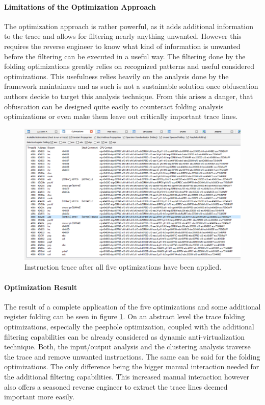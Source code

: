 \documentclass[10pt,twoside,a4paper,bibliography=totoc]{scrbook}
\begin{document}
\paragraph*{Limitations of the Optimization Approach} The optimization approach is rather powerful, as it adds additional information to the trace and allows for filtering nearly anything unwanted. 
However this requires the reverse engineer to know what kind of information is unwanted before the filtering can be executed in a useful way.
The filtering done by the folding optimizations greatly relies on recognized patterns and useful considered optimizations. This usefulness relies heavily on the analysis done by the framework maintainers and as such is not a sustainable solution once obfuscation authors decide to target this analysis technique. 
From this arises a danger, that obfuscation can be designed quite easily to counteract folding analysis optimizations or even make them leave out critically important trace lines.
  

\begin{figure}[htp]
\centering
\includegraphics[scale=0.48]{images/ch3/optimizations_success.png}
\caption{Instruction trace after all five optimizations have been applied.}
\label{opti3}
\end{figure}

\paragraph*{Optimization Result}The result of a complete application of the five optimizations and some additional register folding can be seen in figure \ref{opti3}. On an abstract level the trace folding optimizations, especially the peephole optimization, coupled with the additional filtering capabilities can be already considered as dynamic anti-virtualization technique. 
Both, the input/output analysis and the clustering analysis traverse the trace and remove unwanted instructions. 
The same can be said for the folding optimizations. The only difference being the bigger manual interaction needed for the additional filtering capabilities. This increased manual interaction however also offers a seasoned reverse engineer to extract the trace lines deemed important more easily. 
\end{document}
